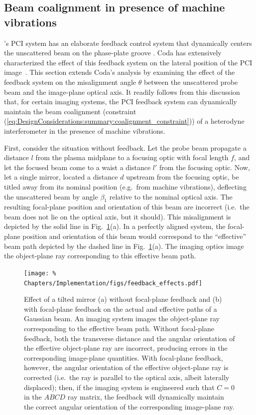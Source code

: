 \subsection{Beam coalignment in presence of machine vibrations}
\diiid's PCI system has an elaborate feedback control system
that dynamically centers the unscattered beam on the phase-plate groove
\cite[Sec.~3.5]{coda_phd}.
Coda has extensively characterized the effect of this feedback system
on the lateral position of the PCI image~\cite[Sec.~3.5(f)]{coda_phd}.
This section extends Coda's analysis by examining
the effect of the feedback system on the misalignment angle $\theta$
between the unscattered probe beam and the image-plane optical axis.
It readily follows from this discussion that,
for certain imaging systems,
the PCI feedback system can dynamically maintain
the beam coalignment
(constraint (\ref{eq:DesignConsiderations:summary:coalignment_constraint}))
of a heterodyne interferometer in the presence of machine vibrations.

First, consider the situation without feedback.
Let the probe beam propagate a distance $l$
from the plasma midplane to a focusing optic with focal length $f$, and
let the focused beam come to a waist a distance $l'$ from the focusing optic.
Now, let a single mirror,
located a distance $d$ upstream from the focusing optic,
be titled away from its nominal position (e.g.\ from machine vibrations),
deflecting the unscattered beam by angle $\beta_1$
relative to the nominal optical axis.
The resulting focal-plane position and orientation of this beam are incorrect
(i.e.\ the beam does not lie on the optical axis, but it should).
This misalignment is depicted by the solid line in
Fig.~\ref{fig:Implementation:feedback_effects}(a).
In a perfectly aligned system,
the focal-plane position and orientation of this beam
would correspond to the ``effective'' beam path
depicted by the dashed line in
Fig.~\ref{fig:Implementation:feedback_effects}(a).
The imaging optics image the object-plane ray
corresponding to this effective beam path.

\begin{figure}
  \centering
  \texttt{[image: \%
    Chapters/Implementation/figs/feedback\_effects.pdf]}
  \caption[Effect of focal-plane feedback on imaged radiation]{%
    Effect of a tilted mirror
    (a) without focal-plane feedback and
    (b) with focal-plane feedback
    on the actual and effective paths of a Gaussian beam.
    An imaging system images the object-plane ray
    corresponding to the effective beam path.
    Without focal-plane feedback,
    both the transverse distance and the angular orientation
    of the effective object-plane ray are incorrect,
    producing errors in the corresponding image-plane quantities.
    With focal-plane feedback, however,
    the angular orientation of the effective object-plane ray is corrected
    (i.e.\ the ray is parallel to the optical axis,
    albeit laterally displaced);
    then, if the imaging system is engineered
    such that $C = 0$ in the $ABCD$ ray matrix,
    the feedback will dynamically maintain
    the correct angular orientation of the corresponding image-plane ray.
  }
\label{fig:Implementation:feedback_effects}
\end{figure}

